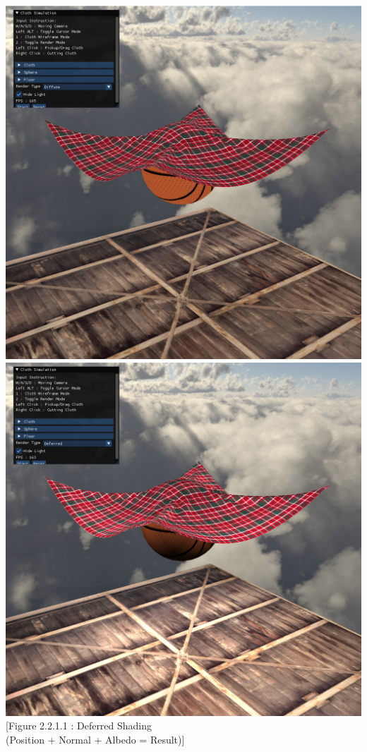 \documentclass{article}
\begin{document}
\begin{multicols}{2}
\includegraphics[scale = 0.2]{Deferred_Albedo}
\includegraphics[scale = 0.2]{Deferred_Result}
[Figure 2.2.1.1 : Deferred Shading \\(Position + Normal + Albedo = Result)]\newline


\end{multicols}
\end{document}

